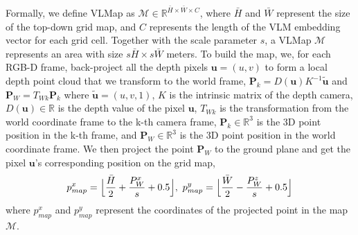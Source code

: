 \documentclass[letterpaper, 10 pt, conference]{ieeeconf}  %
\begin{document}
Formally, we define VLMap as $\mathcal{M} \in \mathbb{R}^{\bar{H} \times \bar{W} \times C}$, where $\bar{H}$ and $\bar{W}$ represent the size of the top-down grid map, and $C$ represents the length of the VLM embedding vector for each grid cell. Together with the scale parameter $s$, a VLMap $\mathcal{M}$ represents an area with size $s\bar{H} \times s\bar{W}$ meters.
To build the map, we, for each RGB-D frame, back-project all the depth pixels $\mathbf{u} = (u, v)$ to form a local depth point cloud that we transform to the world frame, $\mathbf{P}_{k} = D(\mathbf{u}) K^{-1} \mathbf{\tilde{u}}$ and $\mathbf{P}_{W} = T_{Wk} \mathbf{P}_{k}$
where $\mathbf{\tilde{u}} = (u, v, 1)$, $K$ is the intrinsic matrix of the depth camera, $D(\mathbf{u}) \in \mathbb{R}$ is the depth value of the pixel $\mathbf{u}$, $T_{Wk}$ is the transformation from the world coordinate frame to the k-th camera frame, $\mathbf{P}_{k} \in \mathbb{R}^{3}$ is the 3D point position in the k-th frame, and $\mathbf{P}_{W} \in \mathbb{R}^{3}$ is the 3D point position in the world coordinate frame. We then project the point $\mathbf{P}_{W}$ to the ground plane and get the pixel $\mathbf{u}$'s corresponding position on the grid map,
\begin{equation}
\label{eq:px_map}
p^{x}_{map} = \Bigl\lfloor \frac{\bar{H}}{2} + \frac{P^{x}_{W}}{s} + 0.5 \Bigr\rfloor,~ p^{y}_{map} = \Bigl\lfloor \frac{\bar{W}}{2} - \frac{P^{z}_{W}}{s} +0.5 \Bigr\rfloor
\end{equation}
where $p^{x}_{map}$ and $p^{y}_{map}$ represent the coordinates of the projected point in the map $\mathcal{M}$.
\end{document}
